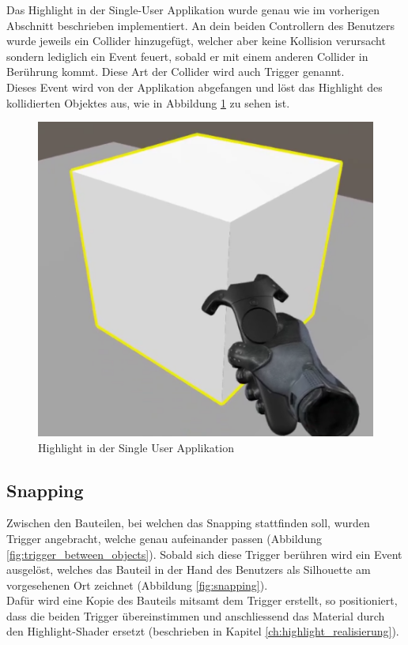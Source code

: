 \noindent Das Highlight in der Single-User Applikation wurde genau wie im vorherigen Abschnitt beschrieben implementiert. An dein beiden Controllern des Benutzers wurde jeweils ein Collider hinzugefügt, welcher aber keine Kollision verursacht sondern lediglich ein Event feuert, sobald er mit einem anderen Collider in Berührung kommt. Diese Art der Collider wird auch Trigger genannt. \\
Dieses Event wird von der Applikation abgefangen und löst das Highlight des kollidierten Objektes aus, wie in Abbildung \ref{fig:highlight_single_user_application} zu sehen ist.

\begin{figure}[h!]
	\centering
	\includegraphics[keepaspectratio,width=0.4\linewidth]{img/Single_User_Highlight.PNG}
	\caption{Highlight in der Single User Applikation}
	\label{fig:highlight_single_user_application}
\end{figure}

\subsection{Snapping}
\label{ch:snapping}
Zwischen den Bauteilen, bei welchen das Snapping stattfinden soll, wurden Trigger angebracht, welche genau aufeinander passen (Abbildung \ref{fig:trigger_between_objects}). Sobald sich diese Trigger berühren wird ein Event ausgelöst, welches das Bauteil in der Hand des Benutzers als Silhouette am vorgesehenen Ort zeichnet (Abbildung \ref{fig:snapping}). \\
Dafür wird eine Kopie des Bauteils mitsamt dem Trigger erstellt, so positioniert, dass die beiden Trigger übereinstimmen und anschliessend das Material durch den Highlight-Shader ersetzt (beschrieben in Kapitel \ref{ch:highlight_realisierung}).

